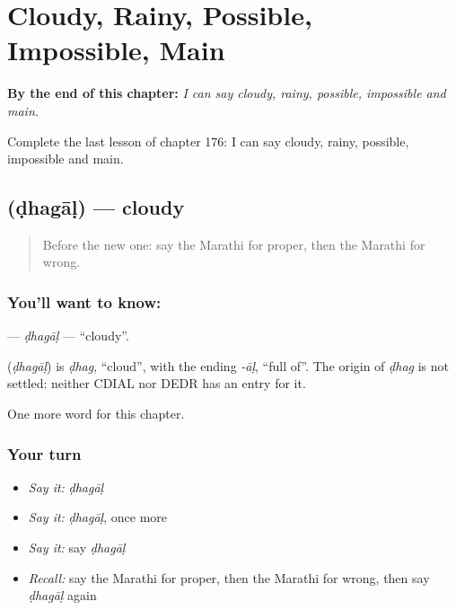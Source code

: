 
\chapter{Cloudy, Rainy, Possible, Impossible, Main}
\label{ch:mr-cloudy-rainy-possible-impossible-main}

\begin{chapteropening}
\textbf{By the end of this chapter:} \emph{I can say cloudy, rainy, possible, impossible and main.}

Complete the last lesson of chapter 176: I can say cloudy, rainy, possible, impossible and main.
\end{chapteropening}

\section[\texorpdfstring{\mr{ढगाळ} (ḍhagāḷ)}{ढगाळ (ḍhagāḷ)}]{ (ḍhagāḷ) — cloudy}

\label{lesson:MR-C176-dhagal}



\begin{quote}
Before the new one: say the Marathi for proper, then the Marathi for wrong.
\end{quote}

\subsection*{You'll want to know: }
\textbf{} — \emph{ḍhagāḷ} — \textquotedblleft{}cloudy\textquotedblright{}.

\begin{cousinweb}
\textbf{} (\emph{ḍhagāḷ}) is \emph{ḍhag}, \textquotedblleft{}cloud\textquotedblright{}, with the ending \emph{-āḷ}, \textquotedblleft{}full of\textquotedblright{}. The origin of \emph{ḍhag} is not settled: neither CDIAL nor DEDR has an entry for it.
\end{cousinweb}

\begin{grammarlens}[title={What you've built}]
One more word for this chapter.
\end{grammarlens}

\subsection*{Your turn}
\begin{itemize}
\raggedright
  \item \emph{Say it:} \emph{ḍhagāḷ}
  \item \emph{Say it:} \emph{ḍhagāḷ}, once more
  \item \emph{Say it:} say \emph{ḍhagāḷ}
  \item \emph{Recall:} say the Marathi for proper, then the Marathi for wrong, then say \emph{ḍhagāḷ} again
\end{itemize}

